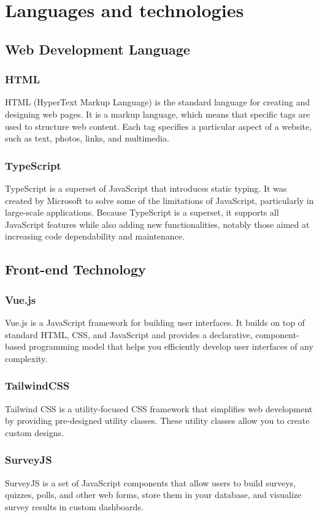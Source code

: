 \documentclass[12pt,oneside,openright,a4paper]{cpe-english-project}
\begin{document}
\section{Languages and technologies}
\subsection{Web Development Language}
\subsubsection{HTML} HTML (HyperText Markup Language) is the standard language for creating and designing web pages. It is a markup language, which means that specific tags are used to structure web content. Each tag specifies a particular aspect of a website, such as text, photos, links, and multimedia.

\subsubsection{TypeScript} TypeScript is a superset of JavaScript that introduces static typing. It was created by Microsoft to solve some of the limitations of JavaScript, particularly in large-scale applications. Because TypeScript is a superset, it supports all JavaScript features while also adding new functionalities, notably those aimed at increasing code dependability and maintenance.

\subsection{Front-end Technology}
\subsubsection{Vue.js} Vue.js is a JavaScript framework for building user interfaces. It builds on top of standard HTML, CSS, and JavaScript and provides a declarative, component-based programming model that helps you efficiently develop user interfaces of any complexity.

\subsubsection{TailwindCSS} Tailwind CSS is a utility-focused CSS framework that simplifies web development by providing pre-designed utility classes. These utility classes allow you to create custom designs.

\subsubsection{SurveyJS} SurveyJS is a set of JavaScript components that allow users to build surveys, quizzes, polls, and other web forms, store them in your database, and visualize survey results in custom dashboards.
\end{document}
